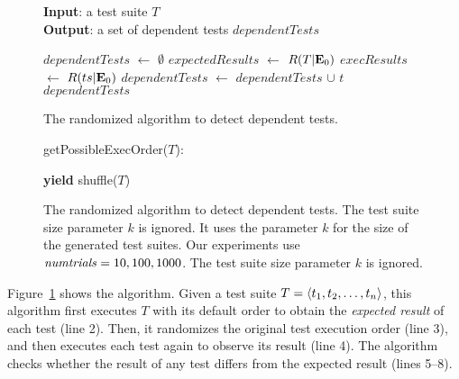 \begin{figure}[t]
\textbf{Input}: a test suite $\mathit{T}$\\
\textbf{Output}: a set of dependent tests $\mathit{dependentTests}$\\
\vspace{-5mm}
\begin{algorithmic}[1]
\STATE $\mathit{dependentTests}$ $\leftarrow$ $\emptyset$
\STATE $\mathit{expectedResults}$ $\leftarrow$ $R(T|\mathbf{E}_0)$
\STATE $\mathit{execResults}$ $\leftarrow$ $R(ts|\mathbf{E}_0)$
\STATE $\mathit{dependentTests}$ $\leftarrow$ $\mathit{dependentTests}$ $\cup$ $\mathit{t}$
\ENDIF
\ENDFOR
\ENDFOR
\RETURN $\mathit{dependentTests}$
\end{algorithmic}


\vspace{-3mm}
\caption {The randomized algorithm to detect dependent tests.
}
\label{fig:basealgorithm}
\end{figure}


\begin{figure}[t]
getPossibleExecOrder($T$):\\
\vspace{-5mm}
\begin{algorithmic}[1]
\STATE \textbf{yield} shuffle($T$)
\ENDFOR
\end{algorithmic}

\vspace{-3mm}
\caption {The randomized algorithm to detect dependent tests.
  The test suite size parameter
$k$ is ignored.
It uses the parameter $k$ for the size of the generated test suites.
Our experiments use $\mathit{numtrials} = 10,
100, 1000$.  The test suite size parameter
$k$ is ignored.}
\label{fig:randalgorithm}
\end{figure}


Figure~\ref{fig:basealgorithm} shows the algorithm.
Given a test suite $T =  \langle t_1, t_2, \ldots, t_n \rangle $, this algorithm
first executes $T$ with its default order
to obtain the \emph{expected result} of each test (line 2).
Then, it randomizes the original
test execution order (line 3), and then executes each test
again to observe its result (line 4). The algorithm checks
whether the result of any test differs from the
expected result (lines 5--8). 

